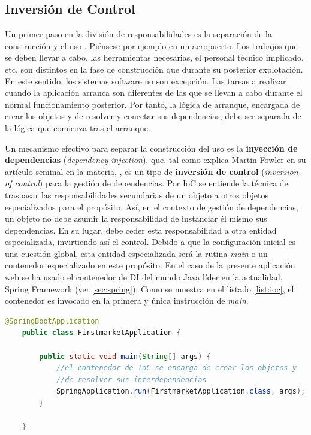 \documentclass[a4paper,12pt,twoside,openright]{report}
\begin{document}
    \subsection{Inversión de Control} \label{sec:ioc}
    Un primer paso en la división de responsabilidades es la separación de la construcción y el uso \cite{Martin2009} \cite{Lopez2019}. Piénsese por ejemplo en un aeropuerto. Los trabajos que se deben llevar a cabo, las herramientas necesarias, el personal técnico implicado, etc. son distintos en la fase de construcción que durante su posterior explotación. En este sentido, los sistemas software no son excepción. Las tareas a realizar cuando la aplicación arranca son diferentes de las que se llevan a cabo durante el normal funcionamiento posterior. Por tanto, la lógica de arranque, encargada de crear los objetos y de resolver y conectar sus dependencias, debe ser separada de la lógica que comienza tras el arranque.
    
    Un mecanismo efectivo para separar la construcción del uso es la \textbf{inyección de dependencias} (\emph{dependency injection}), que, tal como explica Martin Fowler en su artículo seminal en la materia, \cite{Fowler2004}, es un tipo de \textbf{inversión de control} (\emph{inversion of control}) para la gestión de dependencias. Por IoC se entiende la técnica de traspasar las responsabilidades secundarias de un objeto a otros objetos especializados para el propósito. Así, en el contexto de gestión de dependencias, un objeto no debe asumir la responsabilidad de instanciar él mismo sus dependencias. En su lugar, debe ceder esta responsabilidad a otra entidad especializada, invirtiendo así el control. Debido a que la configuración inicial es una cuestión global, esta entidad especializada será la rutina \emph{main} o un contenedor especializado en este propósito. En el caso de la presente aplicación web se ha usado el contenedor de DI del mundo Java líder en la actualidad, Spring Framework (ver \ref{sec:spring}). Como se muestra en el listado \ref{list:ioc}, el contenedor es invocado en la primera y única instrucción de \emph{main}.
    \\
    
    \begin{lstlisting}[language=Java,caption=Inversión de control de dependencias,label=list:ioc]
    @SpringBootApplication
    public class FirstmarketApplication {
    
    	public static void main(String[] args) {
    		//el contenedor de IoC se encarga de crear los objetos y 
    		//de resolver sus interdependencias
    		SpringApplication.run(FirstmarketApplication.class, args);
    	}
    
    }
    \end{lstlisting}
    
\end{document}
